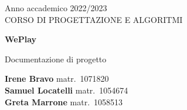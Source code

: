 \begin{titlepage}
    \begin{center}
        \large
        Anno accademico 2022/2023 \\
        CORSO DI PROGETTAZIONE E ALGORITMI

        \vfill

        \Huge
        \textbf{WePlay}

        \LARGE
        Documentazione di progetto
    \end{center}

    \vfill

    \begin{flushleft}
        \large
        \textbf{Irene Bravo} matr.~1071820 \\
        \smallskip
        \textbf{Samuel Locatelli} matr.~1054674 \\
        \smallskip
        \textbf{Greta Marrone} matr.~1058513
    \end{flushleft}

\end{titlepage}